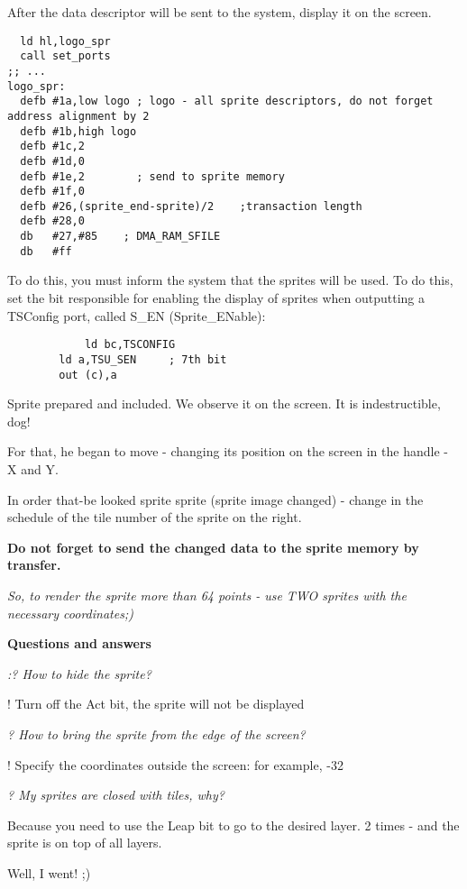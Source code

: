 \documentclass{article}
\begin{document}
After the data descriptor will be sent to the system, display it on
the screen.

\begin{verbatim}
  ld hl,logo_spr
  call set_ports
;; ...
logo_spr:
  defb #1a,low logo ; logo - all sprite descriptors, do not forget address alignment by 2
  defb #1b,high logo
  defb #1c,2
  defb #1d,0
  defb #1e,2        ; send to sprite memory
  defb #1f,0
  defb #26,(sprite_end-sprite)/2    ;transaction length
  defb #28,0
  db   #27,#85    ; DMA_RAM_SFILE
  db   #ff
\end{verbatim}

To do this, you must inform the system that the sprites will be
used. To do this, set the bit responsible for enabling the display of
sprites when outputting a TSConfig port, called S\_EN
(Sprite\_ENable):

\begin{verbatim}
    		ld bc,TSCONFIG
		ld a,TSU_SEN     ; 7th bit
		out (c),a
\end{verbatim}

Sprite prepared and included. We observe it on the screen. It is
indestructible, dog!

For that, he began to move - changing its position on the screen in
the handle - X and Y.

In order that-be looked sprite sprite (sprite image changed) - change
in the schedule of the tile number of the sprite on the right.

\textbf{Do not forget to send the changed data to the sprite memory by
  transfer. }

\emph{So, to render the sprite more than 64 points - use TWO sprites
  with the necessary coordinates;) }

\textbf{Questions and answers }

\emph{:? How to hide the sprite? }

! Turn off the Act bit, the sprite will not be displayed

\emph{? How to bring the sprite from the edge of the screen? }

! Specify the coordinates outside the screen: for example, -32

\emph{? My sprites are closed with tiles, why?}

Because you need to use the Leap bit to go to the desired layer. 2
times - and the sprite is on top of all layers.

Well, I went! ;)
\end{document}
